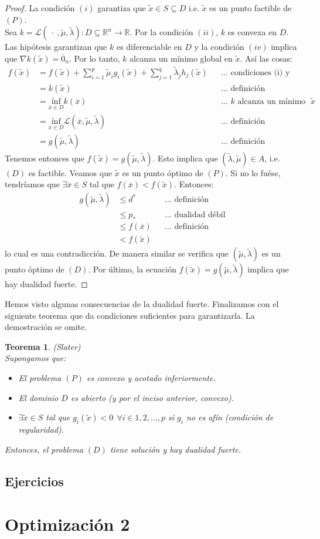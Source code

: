 \documentclass[11pt]{report}
\newtheorem{theorem}{Teorema}[section]
\newcommand{\Rn}{\mathbb{R}^{n}}
\newcommand{\R}{\mathbb{R}}
\newcommand{\x}{\overline{x}}
\newcommand{\z}{\overline{0}_{n}}
\newcommand{\Sp}{1,2,\ldots, p}
\newcommand{\La}{\mathcal{L}}
\newcommand{\po}{p_{*}}
\newcommand{\deo}{d^{*}}
\newcommand{\xc}{\widetilde{x}}
\newcommand{\muc}{\widetilde{\mu}}
\newcommand{\lac}{\widetilde{\lambda}}
\begin{document}
\begin{proof}
La condición $(i)$ garantiza que $\xc\in S\subseteq D$ i.e. $\xc$ es un punto factible de $(P)$.\\
Sea $k=\La(\ \cdot\ ,\muc, \lac):D\subseteq\Rn\rightarrow\R$. Por la condición $(ii)$, $k$ es convexa en $D$. Las hipótesis garantizan que $k$ es diferenciable en $D$ y la condición $(iv)$ implica que $\nabla k(\xc)=\z$. Por lo tanto, $k$ alcanza un mínimo global en $\xc$. Así las cosas:
\begin{equation*}
\begin{aligned}
f(\xc)&=f(\xc)+\sum_{i=1}^{p}\muc_{i} g_{i}(\xc) + \sum_{j=1}^{q}\lac_{j} h_{j}(\xc) &&\text{... condiciones (i) y (iii)}\\
&=k(\xc) &&\text{... definición}\\
&= \underset{\x\in D}{\text{ínf}} k(\x) &&\text{... $k$ alcanza un mínimo global en $\xc$} \\
&= \underset{\x\in D}{\text{ínf}}\La(\x,\muc,\lac) &&\text{... definición}\\
&=g(\muc,\lac) &&\text{... definición}
\end{aligned}
\end{equation*}
Tenemos entonces que $f(\xc)=g(\muc,\lac)$. Esto implica que $(\lac,\muc)\in A$, i.e. $(D)$ es factible. Veamos que $\xc$ es un punto óptimo de $(P)$. Si no lo fuése, tendríamos que $\exists\x \in S$ tal que $f(\x)<f(\xc)$. Entonces:
\begin{equation*}
\begin{aligned}
g(\muc,\lac)&\leq\deo &&\text{... definición}\\
&\leq\po &&\text{... dualidad débil}\\
&\leq f(\x) &&\text{... definición}\\
&<f(\xc)
\end{aligned}
\end{equation*}
lo cual es una contradicción. De manera similar se verifica que $(\muc,\lac)$ es un punto óptimo de $(D)$. Por último, la ecuación $f(\xc)=g(\muc,\lac)$ implica que hay dualidad fuerte.
\end{proof}

Hemos visto algunas consecuencias de la dualidad fuerte. Finalizamos con el siguiente teorema que da condiciones suficientes para garantizarla. La demostración se omite.
\begin{theorem}{(Slater)}\\
Supongamos que:
\begin{itemize}
\item[(i)] El problema $(P)$ es convexo y acotado inferiormente.
\item[(ii)] El dominio $D$ es abierto (y por el inciso anterior, convexo).
\item[(iii)] $\exists\widetilde{x}\in S$ tal que $g_{i}(\widetilde{x})<0\ \ \forall i\in\Sp$ si $g_{i}$ no es afín (condición de regularidad).
\end{itemize}
Entonces, el problema $(D)$ tiene solución y hay dualidad fuerte. %
\end{theorem}

\section*{Ejercicios}

\chapter{Optimización 2}
\end{document}
